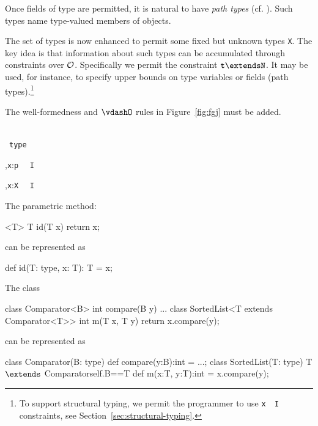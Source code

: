 Once fields of type \type{} are permitted, it is natural to have
\emph{path types} (cf. \cite{scala}). Such types name type-valued members of
objects.

The set of types is now enhanced to permit some fixed but unknown
types {\tt X}. The key idea is that information about such types can
be accumulated through constraints over $\cal O$.  Specifically we
permit the constraint ${\tt t \extends N}$. It may be used, for
instance, to specify upper bounds on type variables or fields (path
types).\footnote{To support structural typing, we permit the
programmer to use {\tt x\ \has\ I} constraints, see
Section~\ref{sec:structural-typing}.}

The well-formedness and $\vdashO$ rules in
Figure~\ref{fig:fgj} must be added.

\begin{figure*}
\quad\\[-12pt]
	{\Gamma {}\ {\tt type}} 



	{\Gamma,{\tt x}:{\tt p} \ \has\ {\tt I}}

	{\Gamma,{\tt x}:{\tt X} \ \has\ {\tt I}}
\caption{\FXG{} semantics}
\label{fig:fgj}
\end{figure*}

\begin{example}
The \FGJ{} parametric method:

\begin{xten} 
 <T> T id(T x) { return x; }
\end{xten}
\noindent can be represented as
\begin{xten} 
def id(T: type, x: T): T = x;
\end{xten}
\end{example}

\begin{example}
\noindent The \FGJ{} class 
\begin{xten} 
class Comparator<B> {
  int compare(B y) { ... } }
class SortedList<T extends Comparator<T>> { 
  int m(T x, T y) {
     return x.compare(y); } }
\end{xten}
\noindent can be represented as
\begin{xtenmath} 
class Comparator(B: type) {
  def compare(y:B):int = ...;
}
class SortedList(T: type)
    {T $\extends$ Comparator{self.B==T}} { 
  def m(x:T, y:T):int = x.compare(y);
}
\end{xtenmath}
\end{example}

